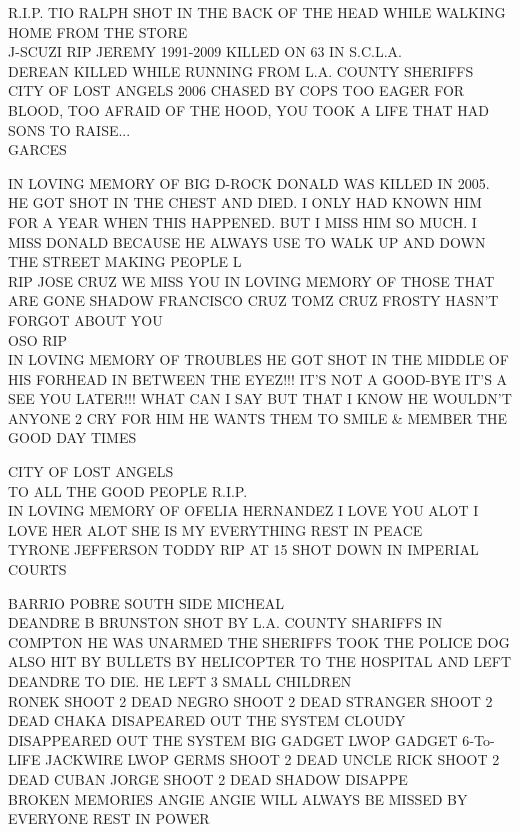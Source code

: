 \documentclass[10pt,letterpaper]{article}
\begin{document}
R.I.P. TIO RALPH SHOT IN THE BACK OF THE HEAD WHILE WALKING HOME FROM THE STORE\\
J{-}SCUZI RIP JEREMY 1991{-}2009 KILLED ON 63 IN S.C.L.A.\\
DEREAN KILLED WHILE RUNNING FROM L.A. COUNTY SHERIFFS CITY OF LOST ANGELS 2006 CHASED BY COPS TOO EAGER FOR BLOOD, TOO AFRAID OF THE HOOD, YOU TOOK A LIFE THAT HAD SONS TO RAISE...\\
GARCES

IN LOVING MEMORY OF BIG D{-}ROCK DONALD WAS KILLED IN 2005.  HE GOT SHOT IN THE CHEST AND DIED.  I ONLY HAD KNOWN HIM FOR A YEAR WHEN THIS HAPPENED.  BUT I MISS HIM SO MUCH.  I MISS DONALD BECAUSE HE ALWAYS USE TO WALK UP AND DOWN THE STREET MAKING PEOPLE L\\
RIP JOSE CRUZ WE MISS YOU IN LOVING MEMORY OF THOSE THAT ARE GONE SHADOW FRANCISCO CRUZ TOMZ CRUZ FROSTY HASN'T FORGOT ABOUT YOU\\
OSO RIP\\
IN LOVING MEMORY OF TROUBLES HE GOT SHOT IN THE MIDDLE OF HIS FORHEAD IN BETWEEN THE EYEZ!!! IT'S NOT A GOOD{-}BYE IT'S A SEE YOU LATER!!! WHAT CAN I SAY BUT THAT I KNOW HE WOULDN'T ANYONE 2 CRY FOR HIM HE WANTS THEM TO SMILE \& MEMBER THE GOOD DAY TIMES

CITY OF LOST ANGELS\\
TO ALL THE GOOD PEOPLE R.I.P.\\
IN LOVING MEMORY OF OFELIA HERNANDEZ I LOVE YOU ALOT I LOVE HER ALOT SHE IS MY EVERYTHING REST IN PEACE\\
TYRONE JEFFERSON TODDY RIP AT 15 SHOT DOWN IN IMPERIAL COURTS

BARRIO POBRE SOUTH SIDE MICHEAL\\
DEANDRE B BRUNSTON SHOT BY L.A. COUNTY SHARIFFS IN COMPTON HE WAS UNARMED THE SHERIFFS TOOK THE POLICE DOG ALSO HIT BY BULLETS BY HELICOPTER TO THE HOSPITAL AND LEFT DEANDRE TO DIE.  HE LEFT 3 SMALL CHILDREN\\
RONEK SHOOT 2 DEAD NEGRO SHOOT 2 DEAD STRANGER SHOOT 2 DEAD CHAKA DISAPEARED OUT THE SYSTEM CLOUDY DISAPPEARED OUT THE SYSTEM BIG GADGET LWOP GADGET 6{-}To{-}LIFE JACKWIRE LWOP GERMS SHOOT 2 DEAD UNCLE RICK SHOOT 2 DEAD CUBAN JORGE SHOOT 2 DEAD SHADOW DISAPPE\\
BROKEN MEMORIES ANGIE ANGIE WILL ALWAYS BE MISSED BY EVERYONE REST IN POWER
\end{document}
